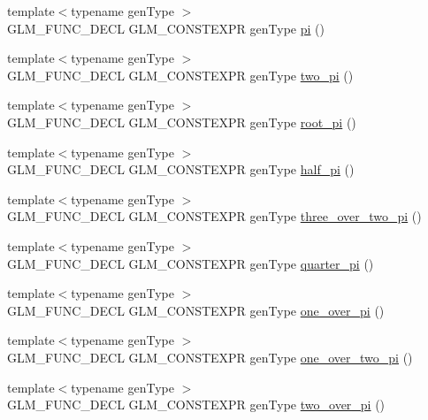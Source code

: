 \begin{DoxyCompactItemize}
{\footnotesize template$<$typename gen\+Type $>$ }\\G\+L\+M\+\_\+\+F\+U\+N\+C\+\_\+\+D\+E\+C\+L G\+L\+M\+\_\+\+C\+O\+N\+S\+T\+E\+X\+P\+R gen\+Type \hyperlink{group__gtc__constants_ga94bafeb2a0f23ab6450fed1f98ee4e45}{pi} ()
\item 
{\footnotesize template$<$typename gen\+Type $>$ }\\G\+L\+M\+\_\+\+F\+U\+N\+C\+\_\+\+D\+E\+C\+L G\+L\+M\+\_\+\+C\+O\+N\+S\+T\+E\+X\+P\+R gen\+Type \hyperlink{group__gtc__constants_gaa5276a4617566abcfe49286f40e3a256}{two\+\_\+pi} ()
\item 
{\footnotesize template$<$typename gen\+Type $>$ }\\G\+L\+M\+\_\+\+F\+U\+N\+C\+\_\+\+D\+E\+C\+L G\+L\+M\+\_\+\+C\+O\+N\+S\+T\+E\+X\+P\+R gen\+Type \hyperlink{group__gtc__constants_ga261380796b2cd496f68d2cf1d08b8eb9}{root\+\_\+pi} ()
\item 
{\footnotesize template$<$typename gen\+Type $>$ }\\G\+L\+M\+\_\+\+F\+U\+N\+C\+\_\+\+D\+E\+C\+L G\+L\+M\+\_\+\+C\+O\+N\+S\+T\+E\+X\+P\+R gen\+Type \hyperlink{group__gtc__constants_ga0c36b41d462e45641faf7d7938948bac}{half\+\_\+pi} ()
\item 
{\footnotesize template$<$typename gen\+Type $>$ }\\G\+L\+M\+\_\+\+F\+U\+N\+C\+\_\+\+D\+E\+C\+L G\+L\+M\+\_\+\+C\+O\+N\+S\+T\+E\+X\+P\+R gen\+Type \hyperlink{group__gtc__constants_gae94950df74b0ce382b1fc1d978ef7394}{three\+\_\+over\+\_\+two\+\_\+pi} ()
\item 
{\footnotesize template$<$typename gen\+Type $>$ }\\G\+L\+M\+\_\+\+F\+U\+N\+C\+\_\+\+D\+E\+C\+L G\+L\+M\+\_\+\+C\+O\+N\+S\+T\+E\+X\+P\+R gen\+Type \hyperlink{group__gtc__constants_ga3c9df42bd73c519a995c43f0f99e77e0}{quarter\+\_\+pi} ()
\item 
{\footnotesize template$<$typename gen\+Type $>$ }\\G\+L\+M\+\_\+\+F\+U\+N\+C\+\_\+\+D\+E\+C\+L G\+L\+M\+\_\+\+C\+O\+N\+S\+T\+E\+X\+P\+R gen\+Type \hyperlink{group__gtc__constants_ga555150da2b06d23c8738981d5013e0eb}{one\+\_\+over\+\_\+pi} ()
\item 
{\footnotesize template$<$typename gen\+Type $>$ }\\G\+L\+M\+\_\+\+F\+U\+N\+C\+\_\+\+D\+E\+C\+L G\+L\+M\+\_\+\+C\+O\+N\+S\+T\+E\+X\+P\+R gen\+Type \hyperlink{group__gtc__constants_ga7c922b427986cbb2e4c6ac69874eefbc}{one\+\_\+over\+\_\+two\+\_\+pi} ()
\item 
{\footnotesize template$<$typename gen\+Type $>$ }\\G\+L\+M\+\_\+\+F\+U\+N\+C\+\_\+\+D\+E\+C\+L G\+L\+M\+\_\+\+C\+O\+N\+S\+T\+E\+X\+P\+R gen\+Type \hyperlink{group__gtc__constants_ga74eadc8a211253079683219a3ea0462a}{two\+\_\+over\+\_\+pi} ()

\end{DoxyCompactItemize}
